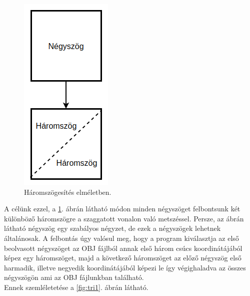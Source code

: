 \begin{figure}[h]
\centering
\includegraphics[scale=0.39]{images/triangulation.png}
\caption{Háromszögesítés elméletben.}
\label{fig:tri}
\end{figure}

A célünk ezzel, a \ref{fig:tri}. ábrán  látható módon minden négyszöget felbontsunk két különböző háromszögre a szaggatott vonalon való metszéssel. Persze, az ábrán látható négyszög egy szabályos négyzet, de ezek a négyszögek lehetnek általánosak.
A felbontás úgy valósul meg, hogy a program kiválasztja az első beolvasott négyszöget az OBJ fájlból annak első három csúcs koordinátájából képez egy háromszöget, majd a következő háromszöget az előző négyszög első harmadik, illetve negyedik koordinátájából képezi le így végighaladva az összes négyszögön ami az OBJ fájlunkban található.\\Ennek szemléletetése a \ref{fig:tri1}. ábrán látható.

